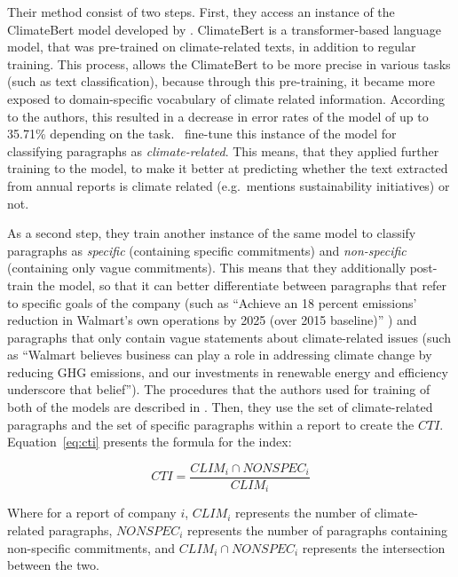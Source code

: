 \documentclass[12pt]{article}
\begin{document}
Their method consist of two steps. First, they access an instance of the ClimateBert model developed by \textcite{webersinkeCLIMATEBERTPretrainedLanguage2022}. ClimateBert is a transformer-based language model, that was pre-trained on climate-related texts, in addition to regular training. This process, allows the ClimateBert to be more precise in various tasks (such as text classification), because through this pre-training, it became more exposed to domain-specific vocabulary of climate related information. According to the authors, this resulted in a decrease in error rates of the model of up to 35.71\% depending on the task.~\citeauthor{binglerHowCheapTalk2024} fine-tune this instance of the model for classifying paragraphs as \textit{climate-related}. This means, that they applied further training to the model, to make it better at predicting whether the text extracted from annual reports is climate related (e.g.~mentions sustainability initiatives) or not. 

As a second step, they train another instance of the same model to classify paragraphs as \textit{specific} (containing specific commitments) and \textit{non-specific} (containing only vague commitments). This means that they additionally post-train the model, so that it can better differentiate between paragraphs that refer to specific goals of the company (such as ``Achieve an 18 percent emissions' reduction in Walmart's own operations by 2025 (over 2015 baseline)'' \parencite{walmart2018csr}) and paragraphs that only contain vague statements about climate-related issues (such as ``Walmart believes business can play a role in addressing climate change by reducing GHG emissions, and our investments in renewable energy and efficiency underscore that belief''). The procedures that the authors used for training of both of the models are described in \textcite{binglerCheapTalkCherrypicking2022,binglerHowCheapTalk2024}. Then, they use the set of climate-related paragraphs and the set of specific paragraphs within a report to create the $CTI$. Equation~\ref{eq:cti} presents the formula for the index:

\begin{equation}\label{eq:cti}
    CTI = \frac{CLIM_i \cap NONSPEC_i}{CLIM_{i}}
\end{equation}

Where for a report of company $i$, $CLIM_i$ represents the number of climate-related paragraphs, $NONSPEC_i$ represents the number of paragraphs containing non-specific commitments, and $CLIM_i \cap NONSPEC_i$ represents the intersection between the two. 
\end{document}
